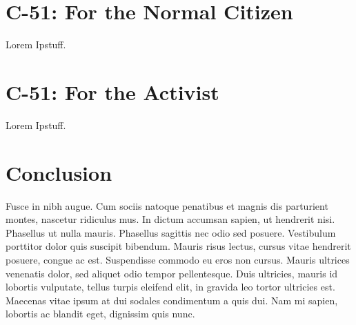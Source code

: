 \documentclass[a4paper, 11pt]{article} %
\begin{document}

\section*{C-51: For the Normal Citizen}
Lorem Ipstuff.

\section*{C-51: For the Activist}
Lorem Ipstuff.


\section*{Conclusion}
Fusce in nibh augue. Cum sociis natoque penatibus et magnis dis parturient montes, nascetur ridiculus mus. In dictum accumsan sapien, ut hendrerit nisi. Phasellus ut nulla mauris. Phasellus sagittis nec odio sed posuere. Vestibulum porttitor dolor quis suscipit bibendum. Mauris risus lectus, cursus vitae hendrerit posuere, congue ac est. Suspendisse commodo eu eros non cursus. Mauris ultrices venenatis dolor, sed aliquet odio tempor pellentesque. Duis ultricies, mauris id lobortis vulputate, tellus turpis eleifend elit, in gravida leo tortor ultricies est. Maecenas vitae ipsum at dui sodales condimentum a quis dui. Nam mi sapien, lobortis ac blandit eget, dignissim quis nunc.







\end{document}
